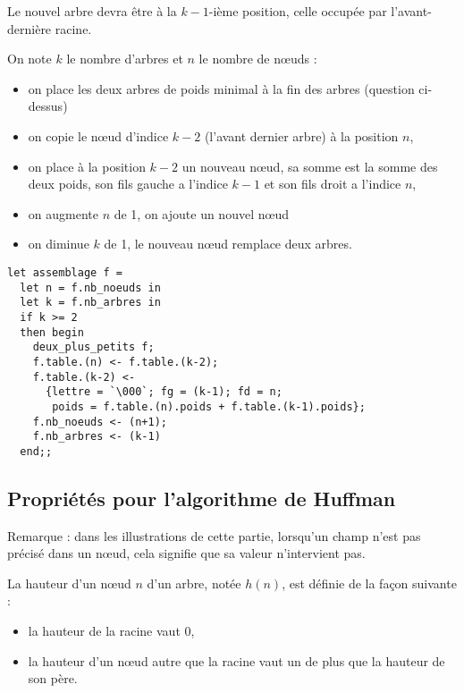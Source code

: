 \begin{Answer}
Le nouvel arbre devra être à la $k-1$-ième position, celle occupée par l'avant-dernière racine.

On note $k$ le nombre d'arbres et $n$ le nombre de nœuds :

\begin{itemize}
\item on place les deux arbres de poids minimal à la fin des arbres (question ci-dessus)
\item on copie le nœud d'indice $k-2$ (l'avant dernier arbre) à la position $n$,
\item on place à la position $k-2$ un nouveau nœud, sa somme est la somme des deux poids, son fils gauche a l'indice $k-1$ et son fils droit a l'indice $n$,
\item on augmente $n$ de 1, on ajoute un nouvel nœud
\item on diminue $k$ de 1, le nouveau nœud remplace deux arbres.
\end{itemize}

\begin{lstlisting}
let assemblage f = 
  let n = f.nb_noeuds in
  let k = f.nb_arbres in
  if k >= 2
  then begin
    deux_plus_petits f;
    f.table.(n) <- f.table.(k-2);
    f.table.(k-2) <- 
      {lettre = `\000`; fg = (k-1); fd = n;
       poids = f.table.(n).poids + f.table.(k-1).poids};
    f.nb_noeuds <- (n+1);
    f.nb_arbres <- (k-1) 
  end;;
\end{lstlisting}
\end{Answer}
\newpage
\subsection{Propriétés pour l’algorithme de Huffman}
Remarque : dans les illustrations de cette partie, lorsqu’un champ n’est pas précisé dans un nœud, cela
signifie que sa valeur n’intervient pas.

La hauteur d’un nœud $n$ d’un arbre, notée $h(n)$, est définie de la façon suivante :
\begin{itemize}
  \item la hauteur de la racine vaut 0,
  \item la hauteur d’un nœud autre que la racine vaut un de plus que la hauteur de son père.
\end{itemize}

